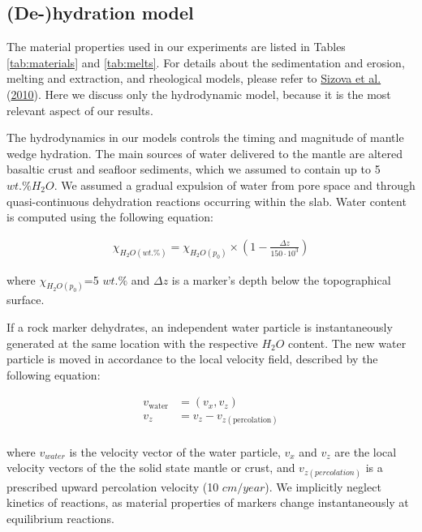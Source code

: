 \documentclass[draft,linenumbers]{agujournal2018}
\begin{document}
\clearpage

\hypertarget{de-hydration-model}{%
\subsection{(De-)hydration model}\label{de-hydration-model}}

The material properties used in our experiments are listed in Tables
\ref{tab:materials} and \ref{tab:melts}. For details about the
sedimentation and erosion, melting and extraction, and rheological
models, please refer to \protect\hyperlink{ref-Sizova2010}{Sizova et
al.} (\protect\hyperlink{ref-Sizova2010}{2010}). Here we discuss only
the hydrodynamic model, because it is the most relevant aspect of our
results.

The hydrodynamics in our models controls the timing and magnitude of
mantle wedge hydration. The main sources of water delivered to the
mantle are altered basaltic crust and seafloor sediments, which we
assumed to contain up to 5 \(wt.\% H_{2}O\). We assumed a gradual
expulsion of water from pore space and through quasi-continuous
dehydration reactions occurring within the slab. Water content is
computed using the following equation:

\[\begin{aligned}\chi_{H_{2}O(wt.\%)} = \chi_{H_{2}O(p_{0})} \times \left( 1 - \frac{\Delta z}{150 \cdot 10^{3}} \right)\end{aligned}\]

where \(\chi_{H_{2}O(p_{0})}\)=5 \(wt.\%\) and \(\Delta z\) is a
marker's depth below the topographical surface.

If a rock marker dehydrates, an independent water particle is
instantaneously generated at the same location with the respective
\(H_{2}O\) content. The new water particle is moved in accordance to the
local velocity field, described by the following equation:

\[\begin{aligned}
v_{\text{water}} & = (v_{x},v_{z}) \\
v_{z} & = v_{z} - v_{z(\text{percolation})} \\
\end{aligned}\]

where \(v_{water}\) is the velocity vector of the water particle,
\(v_{x}\) and \(v_{z}\) are the local velocity vectors of the the solid
state mantle or crust, and \(v_{z(percolation)}\) is a prescribed upward
percolation velocity (10 \(cm/year\)). We implicitly neglect kinetics of
reactions, as material properties of markers change instantaneously at
equilibrium reactions.
\end{document}
